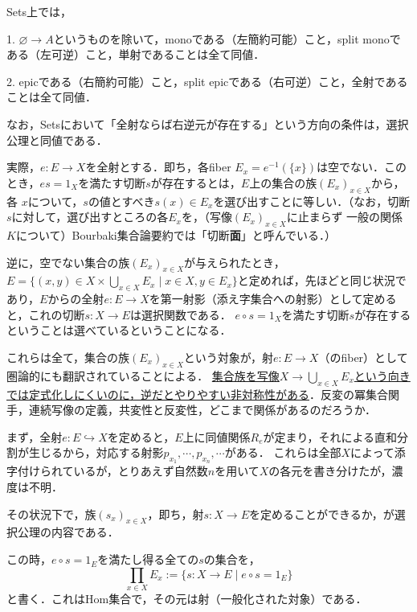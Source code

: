 \documentclass[uplatex, 12pt, dvipdfmx]{jsarticle}
\begin{document}
\begin{example}
    Sets上では，
    
    1. $\varnothing\to A$というものを除いて，monoである（左簡約可能）こと，split monoである（左可逆）こと，単射であることは全て同値．
    
    2. epicである（右簡約可能）こと，split epicである（右可逆）こと，全射であることは全て同値．

    なお，Setsにおいて「全射ならば右逆元が存在する」という方向の条件は，選択公理と同値である．
    
    実際，$e:E\to X$を全射とする．即ち，各fiber $E_x=e^{-1}(\{x\})$は空でない．このとき，$es=1_X$を満たす切断$s$が存在するとは，$E$上の集合の族$(E_x)_{x\in X}$から，各
    $x$について，$s$の値とすべき$s(x)\in E_x$を選び出すことに等しい．（なお，切断$s$に対して，選び出すところの各$E_x$を，（写像$(E_x)_{x\in X}$に止まらず
    一般の関係$K$について）Bourbaki集合論要約では「切断\textbf{面}」と呼んでいる．）

    逆に，空でない集合の族$(E_x)_{x\in X}$が与えられたとき，$E=\{(x,y)\in X\times \bigcup_{x\in X}E_x\mid x\in X, y\in E_x\}$と定めれば，先ほどと同じ状況であり，$E$からの全射$e:E\to X$を第一射影（添え字集合への射影）として定めると，これの切断$s:X\to E$は選択関数である．
    $e\circ s=1_X$を満たす切断$s$が存在するということは選べているということになる．
\end{example}
\begin{remark*}
    これらは全て，集合の族$(E_x)_{x\in X}$という対象が，射$e:E\to X$（のfiber）として圏論的にも翻訳されていることによる．
    \underline{集合族を写像$X\to\bigcup_{x\in X}E_x$という向きでは定式化しにくいのに，逆だとやりやすい非対称性がある}．反変の冪集合関手，連続写像の定義，共変性と反変性，どこまで関係があるのだろうか．

    まず，全射$e:E\hookrightarrow X$を定めると，$E$上に同値関係$R_e$が定まり，それによる直和分割が生じるから，対応する射影$p_{x_1},\cdots,p_{x_n},\cdots$がある．
    これらは全部$X$によって添字付けられているが，とりあえず自然数$n$を用いて$X$の各元を書き分けたが，濃度は不明．
    \begin{center}
    \end{center}
    その状況下で，族$(s_x)_{x\in X}$，即ち，射$s:X\to E$を定めることができるか，が選択公理の内容である．

    この時，$e\circ s=1_E$を満たし得る全ての$s$の集合を，
    \[ \prod_{x\in X} E_x := \{ s:X\to E\mid e\circ s=1_E \}\]
    と書く．これはHom集合で，その元は射（一般化された対象）である．
\end{remark*}
\end{document}
